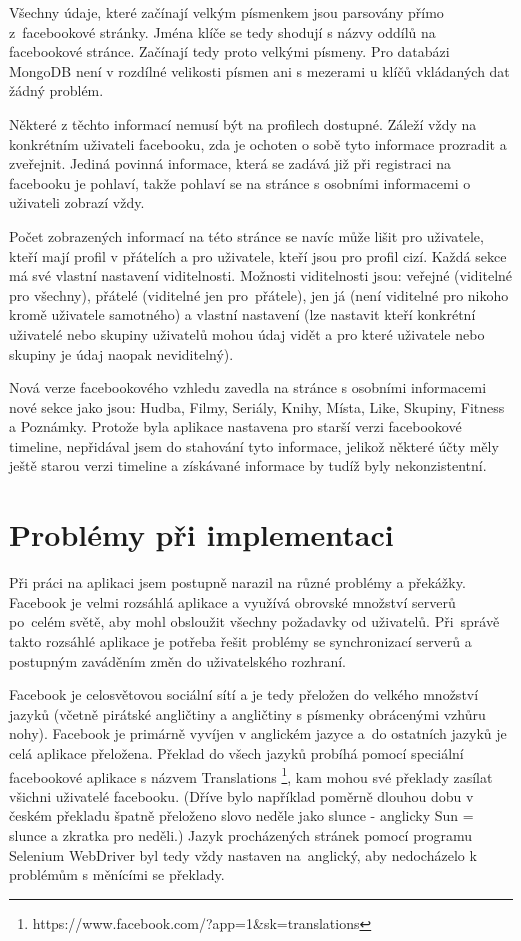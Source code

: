 \documentclass[thesis=M,czech]{FITthesis}[2013/05/10]
\begin{document}
Všechny údaje, které začínají velkým písmenkem jsou parsovány přímo z~facebookové stránky. Jména klíče se tedy shodují s názvy oddílů na facebookové stránce. Začínají tedy proto velkými písmeny. Pro databázi MongoDB není v rozdílné velikosti písmen ani s mezerami u klíčů vkládaných dat žádný problém.

Některé z těchto informací nemusí být na profilech dostupné. Záleží vždy na konkrétním uživateli facebooku, zda je ochoten o sobě tyto informace prozradit a zveřejnit. Jediná povinná informace, která se zadává již při registraci na facebooku je pohlaví, takže pohlaví se na stránce s osobními informacemi o uživateli zobrazí vždy. 

Počet zobrazených informací na této stránce se navíc může lišit pro uživatele, kteří mají profil v přátelích a pro uživatele, kteří jsou pro profil cizí. Každá sekce má své vlastní nastavení viditelnosti. Možnosti viditelnosti jsou: veřejné (viditelné pro všechny), přátelé (viditelné jen pro~přátele), jen já (není viditelné pro nikoho kromě uživatele samotného) a vlastní nastavení (lze nastavit kteří konkrétní uživatelé nebo skupiny uživatelů mohou údaj vidět a pro které uživatele nebo skupiny je údaj naopak neviditelný).

Nová verze facebookového vzhledu zavedla na stránce s osobními informacemi nové sekce jako jsou: Hudba, Filmy, Seriály, Knihy, Místa, Like, Skupiny, Fitness a Poznámky. Protože byla aplikace nastavena pro starší verzi facebookové timeline, nepřidával jsem do stahování tyto informace, jelikož některé účty měly ještě starou verzi timeline a získávané informace by tudíž byly nekonzistentní.



\section{Problémy při implementaci}

Při práci na aplikaci jsem postupně narazil na různé problémy a překážky. Facebook je velmi rozsáhlá aplikace a využívá obrovské množství serverů po~celém světě, aby mohl obsloužit všechny požadavky od uživatelů. Při~správě takto rozsáhlé aplikace je potřeba řešit problémy se synchronizací serverů a postupným zaváděním změn do uživatelského rozhraní.

Facebook je celosvětovou sociální sítí a je tedy přeložen do velkého množství jazyků (včetně pirátské angličtiny a angličtiny s písmenky obrácenými vzhůru nohy). Facebook je primárně vyvíjen v anglickém jazyce a~do ostatních jazyků je celá aplikace přeložena. Překlad do všech jazyků probíhá pomocí speciální facebookové aplikace s názvem Translations \footnote{https://www.facebook.com/?app=1\&sk=translations}, kam mohou své překlady zasílat všichni uživatelé facebooku. (Dříve bylo například poměrně dlouhou dobu v českém překladu špatně přeloženo slovo neděle jako slunce - anglicky Sun = slunce a zkratka pro neděli.) Jazyk procházených stránek pomocí programu Selenium WebDriver byl tedy vždy nastaven na~anglický, aby nedocházelo k problémům s měnícími se překlady. 
\end{document}
